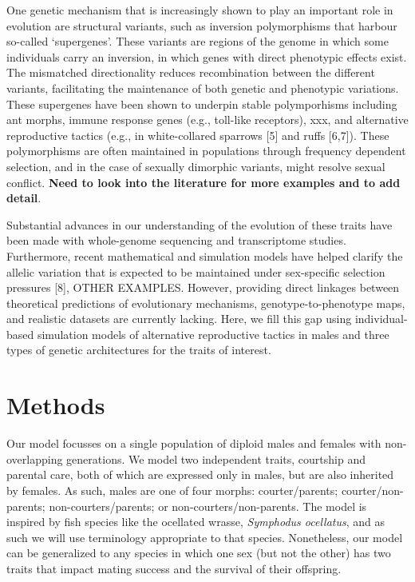 \documentclass[
  11pt,
]{article}
\begin{document}
One genetic mechanism that is increasingly shown to play an important
role in evolution are structural variants, such as inversion
polymorphisms that harbour so-called `supergenes'. These variants are
regions of the genome in which some individuals carry an inversion, in
which genes with direct phenotypic effects exist. The mismatched
directionality reduces recombination between the different variants,
facilitating the maintenance of both genetic and phenotypic variations.
These supergenes have been shown to underpin stable polymporhisms
including ant morphs, immune response genes (e.g., toll-like receptors),
xxx, and alternative reproductive tactics (e.g., in white-collared
sparrows {[}5{]} and ruffs
{[}6,7{]}). These polymorphisms are
often maintained in populations through frequency dependent selection,
and in the case of sexually dimorphic variants, might resolve sexual
conflict. \textbf{Need to look into the literature for more examples and to
add detail}.

Substantial advances in our understanding of the evolution of these
traits have been made with whole-genome sequencing and transcriptome
studies. Furthermore, recent mathematical and simulation models have
helped clarify the allelic variation that is expected to be maintained
under sex-specific selection pressures
{[}8{]}, OTHER EXAMPLES. However,
providing direct linkages between theoretical predictions of
evolutionary mechanisms, genotype-to-phenotype maps, and realistic
datasets are currently lacking. Here, we fill this gap using
individual-based simulation models of alternative reproductive tactics
in males and three types of genetic architectures for the traits of
interest.

\hypertarget{methods}{%
\section{Methods}\label{methods}}

Our model focusses on a single population of diploid males and females
with non-overlapping generations. We model two independent traits,
courtship and parental care, both of which are expressed only in males,
but are also inherited by females. As such, males are one of four
morphs: courter/parents; courter/non-parents; non-courters/parents; or
non-courters/non-parents. The model is inspired by fish species like the
ocellated wrasse, \emph{Symphodus ocellatus}, and as such we will use
terminology appropriate to that species. Nonetheless, our model can be
generalized to any species in which one sex (but not the other) has two
traits that impact mating success and the survival of their offspring.
\end{document}
